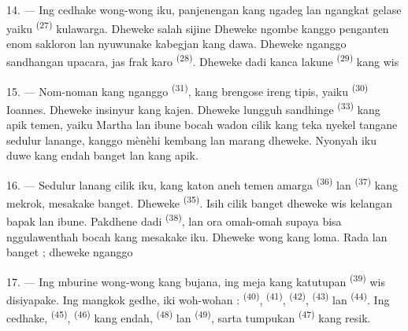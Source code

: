 14. --- Ing cedhake wong-wong iku, panjenengan kang ngadeg lan ngangkat
gelase yaiku  \textsuperscript{(27)} kulawarga. Dheweke
salah sijine  Dheweke
 ngombe kanggo  penganten
enom sakloron lan nyuwunake kabegjan kang dawa. Dheweke nganggo
sandhangan upacara, jas frak karo 
\textsuperscript{(28)}. Dheweke dadi kanca lakune 
\textsuperscript{(29)} kang wis 

15. --- Nom-noman kang nganggo  \textsuperscript{(31)},
kang brengose ireng tipis, yaiku 
\textsuperscript{(30)} Ioannes. Dheweke insinyur kang kajen. Dheweke
lungguh sandhinge  \textsuperscript{(33)} kang apik
temen, yaiku  Martha lan ibune bocah wadon cilik kang
teka nyekel tangane sedulur lanange, kanggo mènèhi kembang lan
  marang dheweke. Nyonyah iku duwe
 kang endah banget lan  kang apik.

16. --- Sedulur lanang cilik iku, kang katon aneh temen amarga
 \textsuperscript{(36)} lan 
\textsuperscript{(37)} kang mekrok, mesakake banget. Dheweke
 \textsuperscript{(35)}. Isih cilik banget dheweke wis
kelangan bapak lan ibune. Pakdhene dadi 
\textsuperscript{(38)}, lan ora omah-omah supaya bisa nggulawenthah
bocah kang mesakake iku. Dheweke wong kang loma. Rada
 lan  banget ; dheweke nganggo

\VUsaut{2.4mm}
\VUsaut{3.0mm}

17. --- Ing mburine wong-wong kang bujana, ing meja kang katutupan
  \textsuperscript{(39)} wis
disiyapake. Ing mangkok gedhe, iki woh-wohan : 
\textsuperscript{(40)},  \textsuperscript{(41)},
 \textsuperscript{(42)}, 
\textsuperscript{(43)} lan  \textsuperscript{(44)}. Ing
cedhake,  \textsuperscript{(45)}, 
\textsuperscript{(46)} kang endah, 
\textsuperscript{(48)} lan  \textsuperscript{(49)},
sarta tumpukan  \textsuperscript{(47)} kang resik.

